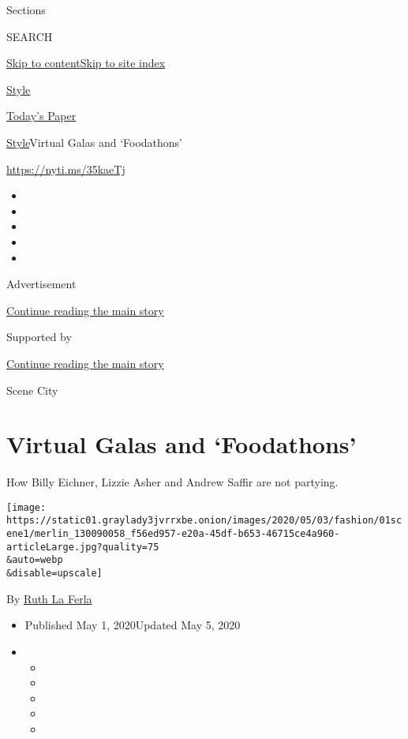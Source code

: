 Sections

SEARCH

\protect\hyperlink{site-content}{Skip to
content}\protect\hyperlink{site-index}{Skip to site index}

\href{https://www.nytimes3xbfgragh.onion/section/style}{Style}

\href{https://myaccount.nytimes3xbfgragh.onion/auth/login?response_type=cookie\&client_id=vi}{}

\href{https://www.nytimes3xbfgragh.onion/section/todayspaper}{Today's
Paper}

\href{/section/style}{Style}\textbar{}Virtual Galas and `Foodathons'

\href{https://nyti.ms/35kaeTj}{https://nyti.ms/35kaeTj}

\begin{itemize}
\item
\item
\item
\item
\item
\end{itemize}

Advertisement

\protect\hyperlink{after-top}{Continue reading the main story}

Supported by

\protect\hyperlink{after-sponsor}{Continue reading the main story}

Scene City

\hypertarget{virtual-galas-and-foodathons}{%
\section{Virtual Galas and
`Foodathons'}\label{virtual-galas-and-foodathons}}

How Billy Eichner, Lizzie Asher and Andrew Saffir are not partying.

\texttt{[image: https://static01.graylady3jvrrxbe.onion/images/2020/05/03/fashion/01scene1/merlin\_130090058\_f56ed957-e20a-45df-b653-46715ce4a960-articleLarge.jpg?quality=75\\\&auto=webp\\\&disable=upscale]}

By \href{https://www.nytimes3xbfgragh.onion/by/ruth-la-ferla}{Ruth La
Ferla}

\begin{itemize}
\item
  Published May 1, 2020Updated May 5, 2020
\item
  \begin{itemize}
  \item
  \item
  \item
  \item
  \item
  \end{itemize}
\end{itemize}

